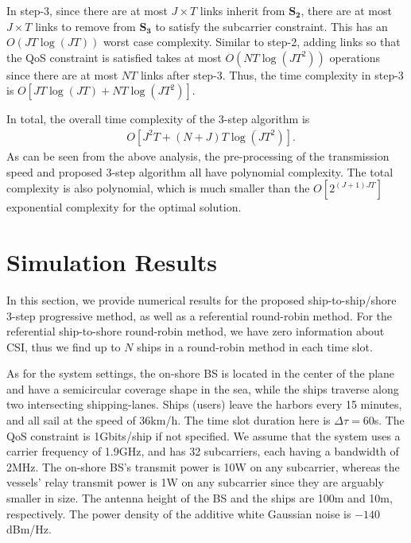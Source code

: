 \documentclass[journal]{IEEEtran}
\begin{document}
 In step-3, since there are at most $ J \times T$  links inherit from ${{\mathbf{S}}_{\mathbf{2}}}$, there are at most $J \times T$ links to remove from ${{\mathbf{S}}_{\mathbf{3}}}$ to satisfy the subcarrier constraint. This has an $O\left( JT\log \left( JT \right) \right)$ worst case complexity. Similar to step-2, adding links so that the QoS constraint is satisfied takes at most $O\left( NT\log \left( JT^2 \right) \right)$ operations since there are at most $NT$ links after step-3. Thus, the time complexity in step-3 is $O\left[ JT \log \left( JT \right) + NT \log \left( {JT^2} \right) \right]$.

 In total, the overall time complexity of the 3-step algorithm is 
 \begin{align}
  &  O\left[  J^2 T  + { \left({N+J}\right) T \log \left( JT^2 \right)} \right].
 \end{align}
 As can be seen from the above analysis, the pre-processing of the transmission speed and proposed 3-step algorithm all have polynomial complexity. The total complexity is also polynomial, which is much smaller than the $O\left[ 2^{\left( J+1 \right)JT} \right]$ exponential complexity for the optimal solution. 
 
 \section{Simulation Results}\label{sec:4}
 
 In this section, we provide numerical results for the proposed ship-to-ship/shore 3-step progressive method, as well as a referential round-robin method. 
 For the referential ship-to-shore round-robin method, we have zero information about CSI, thus we find up to $N$ ships in a round-robin method in each time slot. 
 
 
 
 As for the system settings, the on-shore BS is located in the center of the plane and have a semicircular coverage shape in the sea, while the ships traverse along two intersecting shipping-lanes. 
 Ships (users) leave the harbors every 15 minutes, and all sail at the speed of 36km/h. The time slot duration here is $\Delta \tau = 60$s. The QoS constraint is 1Gbits/ship if not specified. We assume that the system uses a carrier frequency of 1.9GHz, and has 32 subcarriers, each having a bandwidth of 2MHz. The on-shore BS's transmit power is 10W on any subcarrier, whereas the vessels' relay transmit power is 1W on any subcarrier since they are arguably smaller in size. The antenna height of the BS and the ships are 100m and 10m, respectively. The power density of the additive white Gaussian noise is ${-140}$dBm/Hz. 
 
\end{document}
